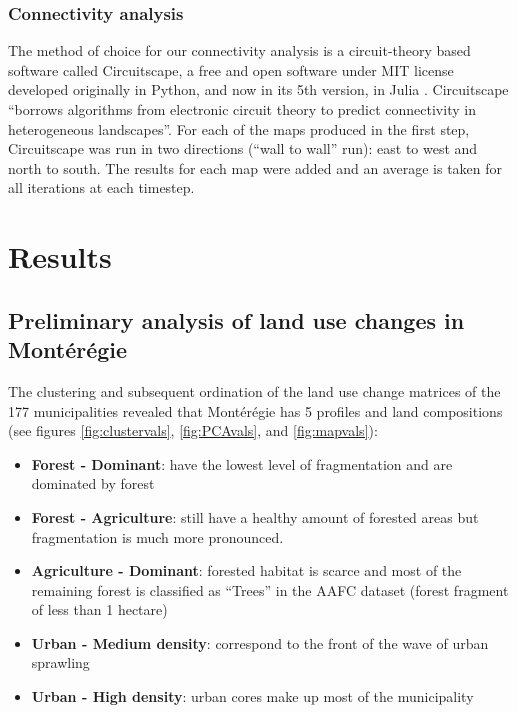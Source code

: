 \subsubsection{Connectivity analysis}
The method of choice for our connectivity analysis is a circuit-theory based software called Circuitscape, a free and open software under MIT license developed originally in Python, and now in its 5th version, in Julia \citep{circuitjulia}.  Circuitscape “borrows algorithms from electronic circuit theory to predict connectivity in heterogeneous landscapes”.
For each of the maps produced in the first step, Circuitscape was run in two directions (“wall to wall” run): east to west and north to south. The results for each map were added and an average is taken for all iterations at each timestep.\\


\section{Results}

\subsection{Preliminary analysis of land use changes in Montérégie}
The clustering and subsequent ordination of the land use change matrices of the 177 municipalities revealed that Montérégie has 5 profiles and land compositions (see figures \ref{fig:clustervals}, \ref{fig:PCAvals}, and \ref{fig:mapvals}):
\renewcommand{\labelitemi}{$\textendash$}
\begin{itemize}[leftmargin=0.5cm]
  \item \textbf{Forest - Dominant}: have the lowest level of fragmentation and are dominated by forest
  \item \textbf{Forest - Agriculture}: still have a healthy amount of forested areas but fragmentation is much more pronounced.
  \item \textbf{Agriculture - Dominant}: forested habitat is scarce and most of the remaining forest is classified as “Trees” in the AAFC dataset (forest fragment of less than 1 hectare)
  \item \textbf{Urban - Medium density}: correspond to the front of the wave of urban sprawling
  \item \textbf{Urban - High density}: urban cores make up most of the municipality
\end{itemize} 

